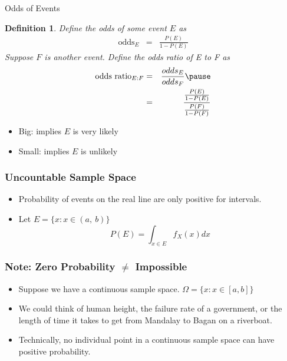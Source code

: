 \documentclass{beamer}
\newtheorem{defn}{Definition}
\numberwithin{equation}{section}
\begin{document}
\begin{frame}{Odds of Events}

\begin{defn}
Define the odds of some event $E$ as 
\begin{eqnarray}
\text{odds}_{E} & = & \frac{P(E)}{1 - P(E)} \nonumber 
\end{eqnarray}
\pause
Suppose $F$ is another event.  Define the \alert{odds ratio} of E to F as
\begin{eqnarray}
\text{odds ratio}_{E:F} & = & \frac{odds_{E}}{odds_{F}} \nonumber \pause \\
& = & \frac{\frac{P(E)}{1-P(E)}}{\frac{P(F)}{1-P(F)}}\nonumber 
\end{eqnarray}


\end{defn}

\begin{itemize}
\item[-] Big: implies $E$ is very likely
\item[-] Small: implies $E$ is unlikely
\end{itemize}



\end{frame}



\begin{frame}
\frametitle{Uncountable Sample Space} 
\begin{itemize}
\item[] Probability of events on the real line are only positive for intervals.
\item Let $E=\{x : x \in(a,\ b)\}$
$$P(E)=\int_{x \in E} f_X(x) dx$$
 \end{itemize}
\end{frame}


\begin{frame}
\frametitle{Note: Zero Probability $\neq$ Impossible} 

\begin{itemize}
\item Suppose we have a continuous sample space.  $\Omega=\{x : x \in [a,b]\}$
\item We could think of human height, the failure rate of a government, or the length of time it takes to get from Mandalay to Bagan on a riverboat.
\item Technically, no individual point in a continuous sample space can have positive probability.  
\end{itemize}
\end{frame}
\end{document}
